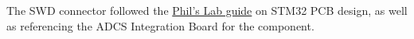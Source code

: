The SWD connector followed the \href{https://www.youtube.com/watch?v=PMEpQZ90f34}{Phil's Lab guide} on STM32 PCB design, as well as referencing the ADCS Integration Board for the component.

